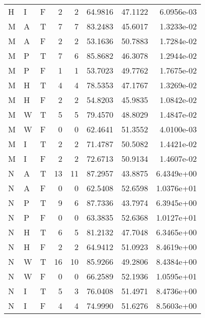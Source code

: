 \begin{tabular}{lllrrrrr}
    H     & I     & F          & 2    & 2     & 64.9816    & 47.1122  & 6.0956e-03 \\
    M     & A     & T          & 7    & 7     & 83.2483    & 45.6017  & 1.3233e-02 \\
    M     & A     & F          & 2    & 2     & 53.1636    & 50.7883  & 1.7284e-02 \\
    M     & P     & T          & 7    & 6     & 85.8682    & 46.3078  & 1.2944e-02 \\
    M     & P     & F          & 1    & 1     & 53.7023    & 49.7762  & 1.7675e-02 \\
    M     & H     & T          & 4    & 4     & 78.5353    & 47.1767  & 1.3269e-02 \\
    M     & H     & F          & 2    & 2     & 54.8203    & 45.9835  & 1.0842e-02 \\
    M     & W     & T          & 5    & 5     & 79.4570    & 48.8029  & 1.4847e-02 \\
    M     & W     & F          & 0    & 0     & 62.4641    & 51.3552  & 4.0100e-03 \\
    M     & I     & T          & 2    & 2     & 71.4787    & 50.5082  & 1.4421e-02 \\
    M     & I     & F          & 2    & 2     & 72.6713    & 50.9134  & 1.4607e-02 \\
    N     & A     & T          & 13   & 11    & 87.2957    & 43.8875  & 6.4349e+00 \\
    N     & A     & F          & 0    & 0     & 62.5408    & 52.6598  & 1.0376e+01 \\
    N     & P     & T          & 9    & 6     & 87.7336    & 43.7974  & 6.3945e+00 \\
    N     & P     & F          & 0    & 0     & 63.3835    & 52.6368  & 1.0127e+01 \\
    N     & H     & T          & 6    & 5     & 81.2132    & 47.7048  & 6.3465e+00 \\
    N     & H     & F          & 2    & 2     & 64.9412    & 51.0923  & 8.4619e+00 \\
    N     & W     & T          & 16   & 10    & 85.9266    & 49.2806  & 8.4384e+00 \\
    N     & W     & F          & 0    & 0     & 66.2589    & 52.1936  & 1.0595e+01 \\
    N     & I     & T          & 5    & 3     & 76.0408    & 51.4971  & 8.4736e+00 \\
    N     & I     & F          & 4    & 4     & 74.9990    & 51.6276  & 8.5603e+00 \\
    \hline
\end{tabular}